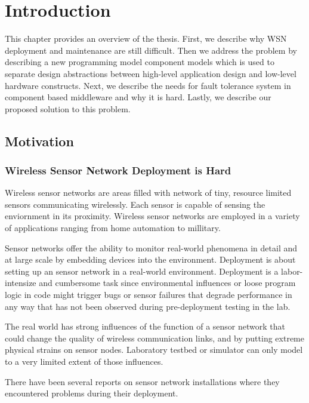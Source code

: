 \chapter{Introduction}
\label{c:intro}

This chapter provides an overview of the thesis. First, we describe why
WSN deployment and maintenance are still difficult. Then we address the problem
by describing a new programming model component models which is used to
separate design abstractions between high-level application design and
low-level hardware constructs. Next, we describe the needs for fault tolerance
system in component based middleware and why it is hard. Lastly, we describe
our proposed solution to this problem.

\section{Motivation}

\subsection{Wireless Sensor Network Deployment is Hard}


Wireless sensor networks are areas filled with network of tiny, resource
limited sensors communicating wirelessly. Each sensor is capable of sensing the
enviornment in its proximity. Wireless sensor networks are employed in
a variety of applications ranging from home automation to millitary.

Sensor networks offer the ability to monitor real-world phenomena in detail and
at large scale by embedding devices into the environment. Deployment is
about setting up an sensor network in a real-world environment. Deployment is
a labor-intensize and cumbersome task since environmental influences or
loose program logic in code might trigger bugs or sensor failures that
degrade performance in any way that has not been observed during pre-deployment
testing in the lab.

The real world has strong influences of the function of a sensor network that
could change the quality of wireless communication links, and by putting
extreme physical strains on sensor nodes. Laboratory testbed or simulator can 
only model to a very limited extent of those influences.

There have been several reports on sensor network installations where they
encountered problems during their
deployment\cite{Barrenetxea2008}\cite{Polastre2004}\cite{Arora2004}\cite{Tateson2005}\cite{Padhy2005}\cite{Stoianov2007}\cite{Tolle2005}\cite{Werner-Allen2006a}.

